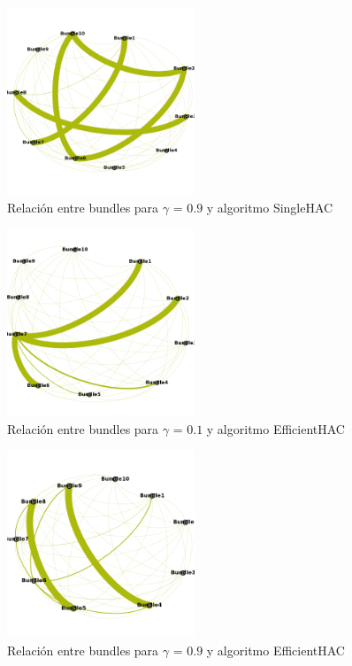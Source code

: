 \begin{figure}[H]
  \centering
    \includegraphics[width=0.5\textwidth]{resultados/papers/intra_inter/hac09.png}
  \caption{Relación entre bundles para $\gamma$ = $0.9$ y algoritmo SingleHAC}
  \label{res:img-papers-gamma09-hac}
\end{figure}

\begin{figure}[H]
  \centering
    \includegraphics[width=0.5\textwidth]{resultados/papers/intra_inter/effhac01.png}
  \caption{Relación entre bundles para $\gamma$ = $0.1$ y algoritmo EfficientHAC}
  \label{res:img-papers-gamma01-effhac}
\end{figure}

\begin{figure}[H]
  \centering
    \includegraphics[width=0.5\textwidth]{resultados/papers/intra_inter/effhac09.png}
  \caption{Relación entre bundles para $\gamma$ = $0.9$ y algoritmo EfficientHAC}
  \label{res:img-papers-gamma09-effhac}
\end{figure}

